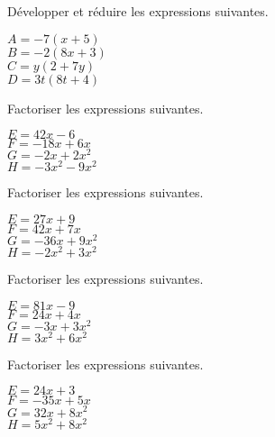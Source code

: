 \documentclass[a4paper,11pt,fleqn]{article}
\begin{document}
\begin{multicols}{2}

Développer et réduire les expressions suivantes.

\begin{multicols}{2}
$A=  -7 (x  +5)$\\
$B= -2 ( 8 x    +3)$\\
$C=y( 2  +7 y)$\\
$D= 3  t(  8 t +4)$
\end{multicols}


Factoriser les expressions suivantes.

\begin{multicols}{2}
$E=  42 x  -6$\\
$F=  -18 x  +6 x$\\
$G=  -2 x  +2 x^2$\\
$H=  -3 x^2  -9 x^2$
\end{multicols}


Factoriser les expressions suivantes.

\begin{multicols}{2}
$E=  27 x  +9$\\
$F=  42 x  +7 x$\\
$G=  -36 x  +9 x^2$\\
$H=  -2 x^2  +3 x^2$
\end{multicols}


Factoriser les expressions suivantes.

\begin{multicols}{2}
$E=  81 x  -9$\\
$F=  24 x  +4 x$\\
$G=  -3 x  +3 x^2$\\
$H=  3 x^2  +6 x^2$
\end{multicols}


Factoriser les expressions suivantes.

\begin{multicols}{2}
$E=  24 x  +3$\\
$F=  -35 x  +5 x$\\
$G=  32 x  +8 x^2$\\
$H=  5 x^2  +8 x^2$
\end{multicols}

\raggedcolumns
\end{multicols}
\end{document}

